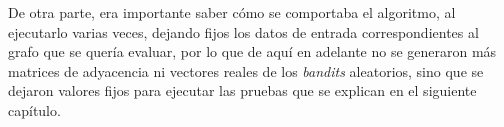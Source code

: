 De otra parte, era importante saber cómo se comportaba el algoritmo, al ejecutarlo varias veces, dejando fijos los datos de entrada correspondientes al grafo que se quería evaluar, por lo que de aquí en adelante no se generaron más matrices de adyacencia ni vectores reales de los \textit{bandits} aleatorios, sino que se dejaron valores fijos para ejecutar las pruebas que se explican en el siguiente capítulo.
